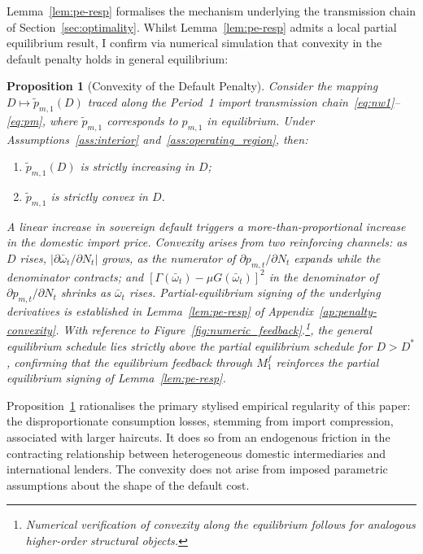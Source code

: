 \documentclass[11pt]{article}
\theoremstyle{definition}
\theoremstyle{plain}
\newtheorem{proposition}{Proposition}
\theoremstyle{remark}
\begin{document}
Lemma~\ref{lem:pe-resp} formalises the mechanism underlying the transmission chain of Section~\ref{sec:optimality}. Whilst Lemma~\ref{lem:pe-resp} admits a local partial equilibrium result, I confirm via numerical simulation that convexity in the default penalty holds in general equilibrium:

\begin{proposition}[Convexity of the Default Penalty]\label{prop:convexity}
Consider the mapping $D \mapsto \widetilde{p}_{m,1}(D)$ traced along the Period~1 import transmission chain~\eqref{eq:nw1}--\eqref{eq:pm}, where $\widetilde{p}_{m,1}$ corresponds to $p_{m,1}$ in equilibrium. Under Assumptions~\ref{ass:interior} and~\ref{ass:operating_region}, then:
\begin{enumerate}
    \item[\textup{(i)}] $\widetilde{p}_{m,1}(D)$ is strictly increasing in $D$;
    \item[\textup{(ii)}] $\widetilde{p}_{m,1}$ is strictly convex in $D$.
\end{enumerate}
A linear increase in sovereign default triggers a more-than-proportional increase in 
the domestic import price. Convexity arises from two reinforcing channels: as $D$ rises, 
$|\partial \bar{\omega}_t / \partial N_t|$ grows, as the numerator of $\partial p_{m,t}/\partial N_t$ 
expands while the denominator contracts; and $[\Gamma(\bar{\omega}_t) - \mu G(\bar{\omega}_t)]^2$ 
in the denominator of $\partial p_{m,t}/\partial N_t$ shrinks as $\bar{\omega}_t$ rises. 
Partial-equilibrium signing of the underlying derivatives is established in Lemma~\ref{lem:pe-resp} 
of Appendix~\ref{ap:penalty-convexity}. With reference to Figure~\ref{fig:numeric_feedback}.\footnote{Numerical verification of convexity along the equilibrium follows \citet{arellano_default_2008} for analogous higher-order structural objects.}, the general equilibrium schedule lies strictly above the partial equilibrium schedule for $D > D^{\ast}$, confirming that the equilibrium feedback through $M^f_1$ reinforces the partial equilibrium signing of Lemma~\ref{lem:pe-resp}.
\end{proposition}

Proposition~\ref{prop:convexity} rationalises the primary stylised empirical regularity of this paper: the disproportionate consumption losses, stemming from import compression, associated with larger haircuts. It does so from an endogenous friction in the contracting relationship between heterogeneous domestic intermediaries and international lenders. The convexity does not arise from imposed parametric assumptions about the shape of the default cost.
\end{document}

